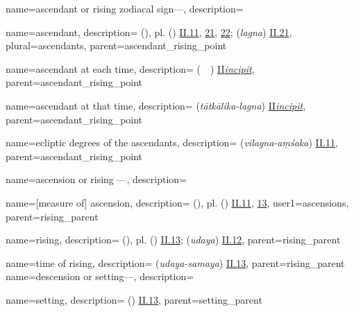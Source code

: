 {
        name={ascendant or rising zodiacal sign---},
        description={\phantom{x}\nopagebreak}
}

{
        name={ascendant},
        description={ (\tali), pl.\thinspace {} (\tawali) \hyperlink{Pii11}{II.11}, \hyperlink{Pii21}{21}, \hyperlink{Pii22}{22};  (\textit{lagna}) \hyperlink{Sii21}{II.21}},
        plural={ascendants},
        parent={ascendant_rising_point}
}

{
        name={ascendant at each time},
        description={ (\tali\ \har\ \vaqt) \hyperlink{PiiInc}{II\thinspace\textit{incipit}}},
        parent={ascendant_rising_point}
}

{
        name={ascendant at that time},
        description={ (\textit{tātkālika-lagna}) \hyperlink{SiiInc}{II\thinspace\textit{incipit}}},
        parent={ascendant_rising_point}
}

{
        name={ecliptic degrees of the ascendants},
        description={ (\textit{vilagna-aṃśaka}) \hyperlink{Sii11}{II.11}},
        parent={ascendant_rising_point}
}


{
        name={ascension or rising ---},
        description={\phantom{x}\nopagebreak}
}

{
        name={[measure of] ascension},
        description={ (\matla), pl.\thinspace {} (\matali) \hyperlink{Pii11}{II.11}, \hyperlink{Pii13}{13}},
        user1={ascensions},
        parent={rising_parent}
}

{
        name={rising},
        description={ (\tali), pl.\thinspace {} (\tawali) \hyperlink{Pii13}{II.13};  (\textit{udaya}) \hyperlink{Sii12}{II.12}},
        parent={rising_parent}
}

{
        name={time of rising},
        description={ (\textit{udaya-samaya}) \hyperlink{Sii13}{II.13}},
        parent={rising_parent}
}
{
        name={descension or setting---},
        description={\phantom{x}\nopagebreak}
}

{
        name={setting},
        description={ (\ghurub) \hyperlink{Pii13}{II.13}},
        parent={setting_parent}
}

